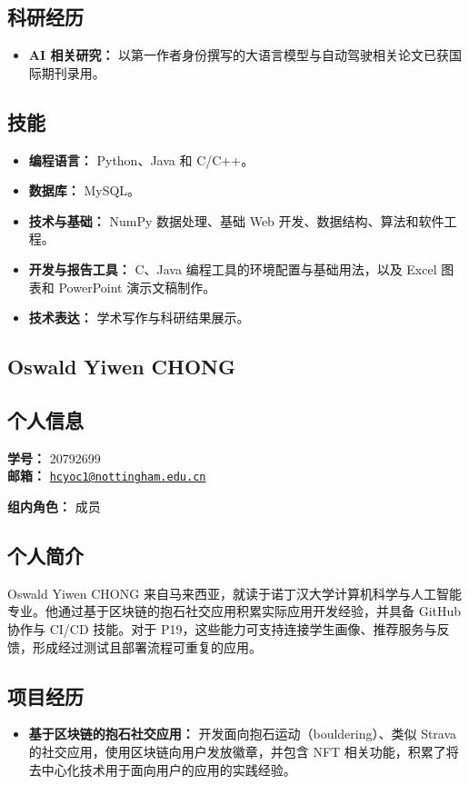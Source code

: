 \documentclass[a4paper,12pt]{article}
\newcommand{\PersonalInformation}[2]{%
  \subsection*{个人信息}
  \if\relax\detokenize{#1}\relax\else
  \noindent\textbf{学号：} #1\\
  \fi
  \textbf{邮箱：} #2\par
}
\begin{document}
\subsection*{科研经历}
\begin{itemize}
  \item \textbf{AI 相关研究：} 以第一作者身份撰写的大语言模型与自动驾驶相关论文已获国际期刊录用。
\end{itemize}

\subsection*{技能}
\begin{itemize}
  \item \textbf{编程语言：} Python、Java 和 C/C++。
  \item \textbf{数据库：} MySQL。
  \item \textbf{技术与基础：} NumPy 数据处理、基础 Web 开发、数据结构、算法和软件工程。
  \item \textbf{开发与报告工具：} C、Java 编程工具的环境配置与基础用法，以及 Excel 图表和 PowerPoint 演示文稿制作。
  \item \textbf{技术表达：} 学术写作与科研结果展示。
\end{itemize}

\subsection{Oswald Yiwen CHONG}
\PersonalInformation{20792699}{\href{mailto:hcyoc1@nottingham.edu.cn}{\nolinkurl{hcyoc1@nottingham.edu.cn}}}
\noindent\textbf{组内角色：} 成员\par

\subsection*{个人简介}
Oswald Yiwen CHONG 来自马来西亚，就读于诺丁汉大学计算机科学与人工智能专业。他通过基于区块链的抱石社交应用积累实际应用开发经验，并具备 GitHub 协作与 CI/CD 技能。对于 P19，这些能力可支持连接学生画像、推荐服务与反馈，形成经过测试且部署流程可重复的应用。

\subsection*{项目经历}
\begin{itemize}
  \item \textbf{基于区块链的抱石社交应用：} 开发面向抱石运动（bouldering）、类似 Strava 的社交应用，使用区块链向用户发放徽章，并包含 NFT 相关功能，积累了将去中心化技术用于面向用户的应用的实践经验。
\end{itemize}
\end{document}
